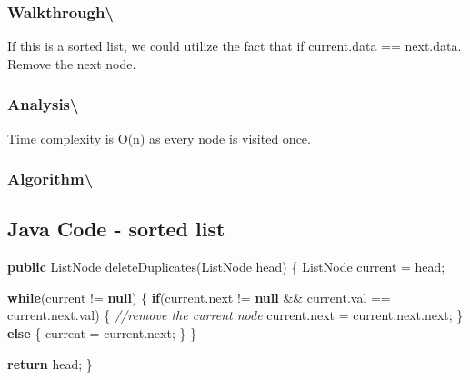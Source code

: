\documentclass[]{book}
\newenvironment{Shaded}{\begin{snugshade}}{\end{snugshade}}
\newcommand{\CommentTok}[1]{\textcolor[rgb]{0.56,0.35,0.01}{\textit{#1}}}
\newcommand{\FunctionTok}[1]{\textcolor[rgb]{0.00,0.00,0.00}{#1}}
\newcommand{\KeywordTok}[1]{\textcolor[rgb]{0.13,0.29,0.53}{\textbf{#1}}}
\newcommand{\NormalTok}[1]{#1}
\begin{document}
\hypertarget{walkthrough-118}{%
\subsubsection{Walkthrough\textbackslash{}}\label{walkthrough-118}}

If this is a sorted list, we could utilize the fact that if current.data == next.data. Remove the next node.

\hypertarget{analysis-125}{%
\subsubsection{Analysis\textbackslash{}}\label{analysis-125}}

Time complexity is O(n) as every node is visited once.

\hypertarget{algorithm-130}{%
\subsubsection{Algorithm\textbackslash{}}\label{algorithm-130}}

\hypertarget{java-code---sorted-list}{%
\subsection{Java Code - sorted list}\label{java-code---sorted-list}}

\begin{Shaded}
\begin{Highlighting}[]
\KeywordTok{public}\NormalTok{ ListNode }\FunctionTok{deleteDuplicates}\NormalTok{(ListNode head) \{}
\NormalTok{    ListNode current = head;}

    \KeywordTok{while}\NormalTok{(current != }\KeywordTok{null}\NormalTok{) \{}
        \KeywordTok{if}\NormalTok{(current.}\FunctionTok{next}\NormalTok{ != }\KeywordTok{null}\NormalTok{ && current.}\FunctionTok{val}\NormalTok{ == current.}\FunctionTok{next}\NormalTok{.}\FunctionTok{val}\NormalTok{) \{}
            \CommentTok{//remove the current node}
\NormalTok{            current.}\FunctionTok{next}\NormalTok{ = current.}\FunctionTok{next}\NormalTok{.}\FunctionTok{next}\NormalTok{;}
\NormalTok{        \} }\KeywordTok{else}\NormalTok{ \{}
\NormalTok{            current = current.}\FunctionTok{next}\NormalTok{;}
\NormalTok{        \}}
\NormalTok{    \}}

    \KeywordTok{return}\NormalTok{ head;}
\NormalTok{\}}
\end{Highlighting}
\end{Shaded}
\end{document}
